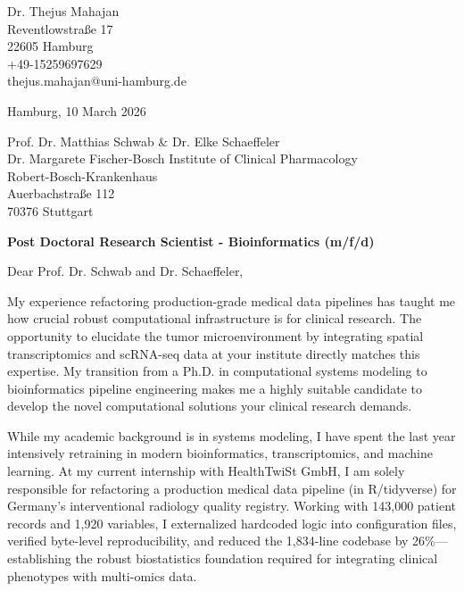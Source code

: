 \documentclass[9pt, a4paper]{extarticle}
\begin{document}
\pagestyle{empty}

\begin{flushleft}
Dr. Thejus Mahajan\\
Reventlowstra{\ss}e 17\\
22605 Hamburg\\
+49-15259697629\\
thejus.mahajan@uni-hamburg.de
\end{flushleft}

\vspace{0.3cm}

\begin{flushright}
Hamburg, 10 March 2026
\end{flushright}

\vspace{0.3cm}

\begin{flushleft}
Prof. Dr. Matthias Schwab \& Dr. Elke Schaeffeler\\
Dr. Margarete Fischer-Bosch Institute of Clinical Pharmacology\\
Robert-Bosch-Krankenhaus\\
Auerbachstra{\ss}e 112\\
70376 Stuttgart
\end{flushleft}

\vspace{0.3cm}

\textbf{Post Doctoral Research Scientist - Bioinformatics (m/f/d)}

\vspace{0.2cm}

Dear Prof. Dr. Schwab and Dr. Schaeffeler,

My experience refactoring production-grade medical data pipelines has taught me how crucial robust computational infrastructure is for clinical research. The opportunity to elucidate the tumor microenvironment by integrating spatial transcriptomics and scRNA-seq data at your institute directly matches this expertise. My transition from a Ph.D. in computational systems modeling to bioinformatics pipeline engineering makes me a highly suitable candidate to develop the novel computational solutions your clinical research demands.

While my academic background is in systems modeling, I have spent the last year intensively retraining in modern bioinformatics, transcriptomics, and machine learning. At my current internship with HealthTwiSt GmbH, I am solely responsible for refactoring a production medical data pipeline (in R/tidyverse) for Germany's interventional radiology quality registry. Working with 143,000 patient records and 1,920 variables, I externalized hardcoded logic into configuration files, verified byte-level reproducibility, and reduced the 1,834-line codebase by 26\%—establishing the robust biostatistics foundation required for integrating clinical phenotypes with multi-omics data.
\end{document}
